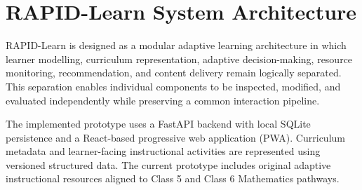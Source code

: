 \documentclass[conference]{IEEEtran}
\begin{document}
\section{RAPID-Learn System Architecture}

RAPID-Learn is designed as a modular adaptive learning architecture in which learner modelling, curriculum representation, adaptive decision-making, resource monitoring, recommendation, and content delivery remain logically separated. This separation enables individual components to be inspected, modified, and evaluated independently while preserving a common interaction pipeline.

The implemented prototype uses a FastAPI backend with local SQLite persistence and a React-based progressive web application (PWA). Curriculum metadata and learner-facing instructional activities are represented using versioned structured data. The current prototype includes original adaptive instructional resources aligned to Class 5 and Class 6 Mathematics pathways.
\end{document}
